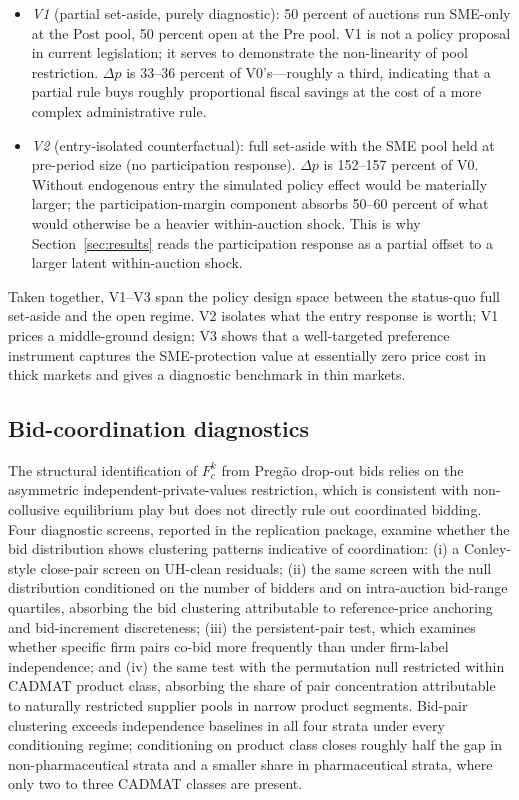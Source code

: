 \begin{itemize}
\item \emph{V1} (partial set-aside, purely diagnostic): 50 percent of auctions run SME-only at the Post pool, 50 percent open at the Pre pool. V1 is not a policy proposal in current legislation; it serves to demonstrate the non-linearity of pool restriction. $\Delta p$ is 33--36 percent of V0's---roughly a third, indicating that a partial rule buys roughly proportional fiscal savings at the cost of a more complex administrative rule.
\item \emph{V2} (entry-isolated counterfactual): full set-aside with the SME pool held at pre-period size (no participation response). $\Delta p$ is 152--157 percent of V0. Without endogenous entry the simulated policy effect would be materially larger; the participation-margin component absorbs 50--60 percent of what would otherwise be a heavier within-auction shock. This is why Section~\ref{sec:results} reads the participation response as a partial offset to a larger latent within-auction shock.
\end{itemize}

Taken together, V1--V3 span the policy design space between the status-quo full set-aside and the open regime. V2 isolates what the entry response is worth; V1 prices a middle-ground design; V3 shows that a well-targeted preference instrument captures the SME-protection value at essentially zero price cost in thick markets and gives a diagnostic benchmark in thin markets.

\subsection{Bid-coordination diagnostics}\label{sec:bid_coord}

The structural identification of $F_c^k$ from Preg\~ao drop-out bids relies on the asymmetric independent-private-values restriction, which is consistent with non-collusive equilibrium play but does not directly rule out coordinated bidding. Four diagnostic screens, reported in the replication package, examine whether the bid distribution shows clustering patterns indicative of coordination: (i) a Conley-style close-pair screen on UH-clean residuals; (ii) the same screen with the null distribution conditioned on the number of bidders and on intra-auction bid-range quartiles, absorbing the bid clustering attributable to reference-price anchoring and bid-increment discreteness; (iii) the \citet{bajariye2003} persistent-pair test, which examines whether specific firm pairs co-bid more frequently than under firm-label independence; and (iv) the same test with the permutation null restricted within CADMAT product class, absorbing the share of pair concentration attributable to naturally restricted supplier pools in narrow product segments. Bid-pair clustering exceeds independence baselines in all four strata under every conditioning regime; conditioning on product class closes roughly half the gap in non-pharmaceutical strata and a smaller share in pharmaceutical strata, where only two to three CADMAT classes are present.

